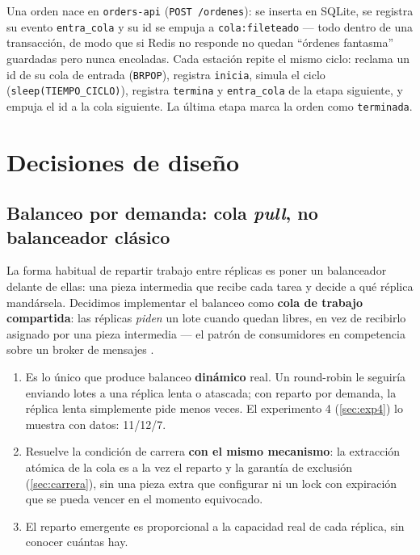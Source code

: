 \documentclass[12pt,a4paper]{article}
\begin{document}
Una orden nace en \texttt{orders-api} (\texttt{POST /ordenes}): se inserta en
SQLite, se registra su evento \texttt{entra\_cola} y su id se empuja a
\texttt{cola:fileteado} — todo dentro de una transacción, de modo que si Redis
no responde no quedan ``órdenes fantasma'' guardadas pero nunca encoladas.
Cada estación repite el mismo ciclo: reclama un id de su cola de entrada
(\texttt{BRPOP}), registra \texttt{inicia}, simula el ciclo
(\texttt{sleep(TIEMPO\_CICLO)}), registra \texttt{termina} y
\texttt{entra\_cola} de la etapa siguiente, y empuja el id a la cola siguiente.
La última etapa marca la orden como \texttt{terminada}.

\section{Decisiones de diseño}

\subsection{Balanceo por demanda: cola \emph{pull}, no balanceador clásico}
\label{sec:pull}

La forma habitual de repartir trabajo entre réplicas es poner un
balanceador delante de ellas: una pieza intermedia que recibe cada
tarea y decide a qué réplica mandársela. Decidimos implementar el balanceo como
\textbf{cola de trabajo compartida}: las réplicas \emph{piden} un lote cuando
quedan libres, en vez de recibirlo asignado por una pieza intermedia — el
patrón de consumidores en competencia sobre un broker de mensajes
\cite{kleppmann}.

\begin{enumerate}[leftmargin=*]
  \item Es lo único que produce balanceo \textbf{dinámico} real. Un
        round-robin le seguiría enviando lotes a una réplica lenta o atascada;
        con reparto por demanda, la réplica lenta simplemente pide menos veces.
        El experimento 4 (\ref{sec:exp4}) lo muestra con datos: 11/12/7.
  \item Resuelve la condición de carrera \textbf{con el mismo mecanismo}: la
        extracción atómica de la cola es a la vez el reparto y la garantía de
        exclusión (\ref{sec:carrera}), sin una pieza extra que configurar ni
        un lock con expiración que se pueda vencer en el momento equivocado.
  \item El reparto emergente es proporcional a la capacidad real de cada
        réplica, sin conocer cuántas hay.
\end{enumerate}
\end{document}
